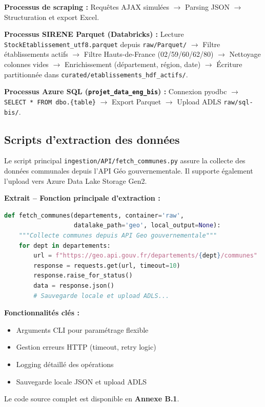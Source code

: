 \documentclass[12pt,a4paper]{article}
\begin{document}
\textbf{Processus de scraping :} Requêtes AJAX simulées $\to$ Parsing JSON $\to$ Structuration et export Excel.

\textbf{Processus SIRENE Parquet (Databricks) :} Lecture \texttt{StockEtablissement\_utf8.parquet} depuis \texttt{raw/Parquet/} $\to$ Filtre établissements actifs $\to$ Filtre Hauts-de-France (02/59/60/62/80) $\to$ Nettoyage colonnes vides $\to$ Enrichissement (département, région, date) $\to$ Écriture partitionnée dans \texttt{curated/etablissements\_hdf\_actifs/}.

\textbf{Processus Azure SQL (\texttt{projet\_data\_eng\_bis}) :} Connexion pyodbc $\to$ \texttt{SELECT * FROM dbo.\{table\}} $\to$ Export Parquet $\to$ Upload ADLS \texttt{raw/sql-bis/}.

\subsection{Scripts d'extraction des données}

Le script principal \texttt{ingestion/API/fetch\_communes.py} assure la collecte des données communales depuis l'API Géo gouvernementale. Il supporte également l'upload vers Azure Data Lake Storage Gen2.

\textbf{Extrait -- Fonction principale d'extraction :}

\begin{lstlisting}[language=Python]
def fetch_communes(departements, container='raw',
                   datalake_path='geo', local_output=None):
    """Collecte communes depuis API Geo gouvernementale"""
    for dept in departements:
        url = f"https://geo.api.gouv.fr/departements/{dept}/communes"
        response = requests.get(url, timeout=10)
        response.raise_for_status()
        data = response.json()
        # Sauvegarde locale et upload ADLS...
\end{lstlisting}

\textbf{Fonctionnalités clés :}
\begin{itemize}
    \item Arguments CLI pour paramétrage flexible
    \item Gestion erreurs HTTP (timeout, retry logic)
    \item Logging détaillé des opérations
    \item Sauvegarde locale JSON et upload ADLS
\end{itemize}

Le code source complet est disponible en \textbf{Annexe B.1}.
\end{document}
